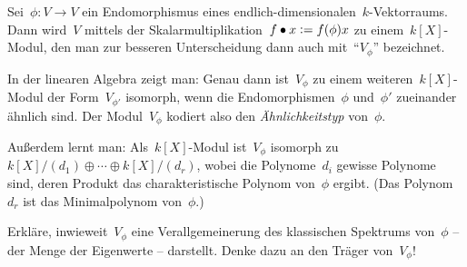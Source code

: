 \documentclass{uebblatt}
\begin{document}
\begin{fun}Sei~$\phi : V \to V$ ein Endomorphismus eines
endlich-dimensionalen~$k$-Vektorraums. Dann wird~$V$ mittels
der Skalarmultiplikation~$f \bullet x \vcentcolon= f(\phi)x$ zu einem~$k[X]$-Modul, den
man zur besseren Unterscheidung dann auch mit~"`$V_\phi$"' bezeichnet.

In der linearen Algebra zeigt man: Genau dann ist~$V_\phi$ zu einem
weiteren~$k[X]$-Modul der Form~$V_{\phi'}$ isomorph, wenn die
Endomorphismen~$\phi$ und~$\phi'$ zueinander ähnlich sind. Der Modul~$V_\phi$
kodiert also den \emph{Ähnlichkeitstyp} von~$\phi$.

Außerdem lernt man: Als~$k[X]$-Modul ist~$V_\phi$ isomorph zu~$k[X]/(d_1)
\oplus \cdots \oplus k[X]/(d_r)$, wobei die Polynome~$d_i$ gewisse Polynome
sind, deren Produkt das charakteristische Polynom von~$\phi$ ergibt. (Das
Polynom~$d_r$ ist das Minimalpolynom von~$\phi$.)

Erkläre, inwieweit~$V_\phi$ eine Verallgemeinerung des klassischen Spektrums
von~$\phi$ -- der Menge der Eigenwerte -- darstellt. Denke dazu an den Träger
von~$V_\phi$!
\end{fun}
\end{document}
